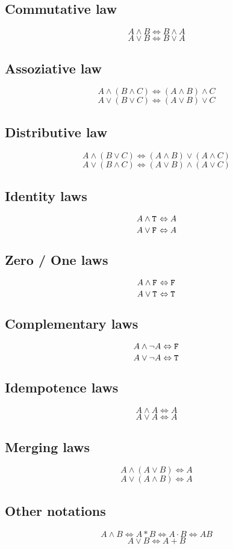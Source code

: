 \documentclass[10pt]{article}
\renewcommand{\t}{\texttt{\text{T}}\hspace{1pt}}
\newcommand{\f}{\texttt{\text{F}}\hspace{1pt}}
\begin{document}
\begin{multicols}{3}
\subsection{Commutative law}
\[
    A \land B \Leftrightarrow B \land A
\] \[
    A \lor B \Leftrightarrow B \lor A
\]

\subsection{Assoziative law}

\[
    A \land (B \land C) \Leftrightarrow (A \land B) \land C
\] \[
    A \lor (B \lor C) \Leftrightarrow (A \lor B) \lor C
\]

\subsection{Distributive law}

\[
    A \land (B \lor C) \Leftrightarrow (A \land B) \lor (A \land C)
\] \[
    A \lor (B \land C) \Leftrightarrow (A \lor B) \land (A \lor C)
\]

\subsection{Identity laws}

\[
    A \land \t \Leftrightarrow A
\] \[
    A \lor \f \Leftrightarrow A
\]

\subsection{Zero / One laws}

\[
    A \land \f \Leftrightarrow \f
\] \[
    A \lor \t \Leftrightarrow \t
\]

\subsection{Complementary laws}

\[
    A \land \neg A \Leftrightarrow \f
\] \[
    A \lor \neg A \Leftrightarrow \t
\]

\subsection{Idempotence laws}

\[
    A \land A \Leftrightarrow A
\] \[
    A \lor A \Leftrightarrow A
\]

\subsection{Merging laws}

\[
    A \land (A \lor B) \Leftrightarrow A
\] \[
    A \lor (A \land B) \Leftrightarrow A
\]

\subsection{Other notations}

\[
    A \land B \Leftrightarrow A*B \Leftrightarrow A{\cdot}B \Leftrightarrow AB
\] \[
    A \lor B \Leftrightarrow A + B
\]
\end{multicols}
\end{document}
